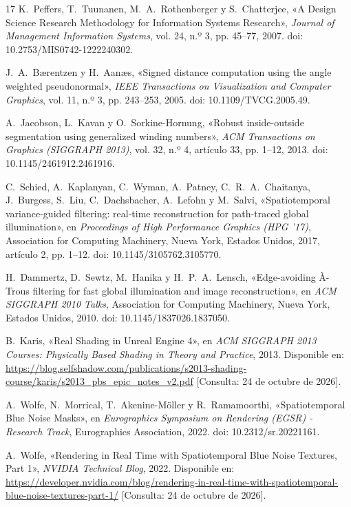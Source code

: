 \begin{thebibliography}{17}
 K.~Peffers, T.~Tuunanen, M.~A.~Rothenberger y S.~Chatterjee, «A Design Science Research Methodology for Information Systems Research», \textit{Journal of Management Information Systems}, vol. 24, n.º 3, pp. 45--77, 2007. doi: 10.2753/MIS0742-1222240302.

 J.~A.~Bærentzen y H.~Aanæs, «Signed distance computation using the angle weighted pseudonormal», \textit{IEEE Transactions on Visualization and Computer Graphics}, vol. 11, n.º 3, pp. 243--253, 2005. doi: 10.1109/TVCG.2005.49.

 A.~Jacobson, L.~Kavan y O.~Sorkine-Hornung, «Robust inside-outside segmentation using generalized winding numbers», \textit{ACM Transactions on Graphics (SIGGRAPH 2013)}, vol. 32, n.º 4, artículo 33, pp. 1--12, 2013. doi: 10.1145/2461912.2461916.

 C.~Schied, A.~Kaplanyan, C.~Wyman, A.~Patney, C.~R.~A.~Chaitanya, J.~Burgess, S.~Liu, C.~Dachsbacher, A.~Lefohn y M.~Salvi, «Spatiotemporal variance-guided filtering: real-time reconstruction for path-traced global illumination», en \textit{Proceedings of High Performance Graphics (HPG ’17)}, Association for Computing Machinery, Nueva York, Estados Unidos, 2017, artículo 2, pp. 1--12. doi: 10.1145/3105762.3105770.

 H.~Dammertz, D.~Sewtz, M.~Hanika y H.~P.~A.~Lensch, «Edge-avoiding À-Trous filtering for fast global illumination and image reconstruction», en \textit{ACM SIGGRAPH 2010 Talks}, Association for Computing Machinery, Nueva York, Estados Unidos, 2010. doi: 10.1145/1837026.1837050.

 B.~Karis, «Real Shading in Unreal Engine 4», en \textit{ACM SIGGRAPH 2013 Courses: Physically Based Shading in Theory and Practice}, 2013. Disponible en: \url{https://blog.selfshadow.com/publications/s2013-shading-course/karis/s2013_pbs_epic_notes_v2.pdf} [Consulta: 24 de octubre de 2026].

 A.~Wolfe, N.~Morrical, T.~Akenine-Möller y R.~Ramamoorthi, «Spatiotemporal Blue Noise Masks», en \textit{Eurographics Symposium on Rendering (EGSR) - Research Track}, Eurographics Association, 2022. doi: 10.2312/sr.20221161.

 A.~Wolfe, «Rendering in Real Time with Spatiotemporal Blue Noise Textures, Part 1», \textit{NVIDIA Technical Blog}, 2022. Disponible en: \url{https://developer.nvidia.com/blog/rendering-in-real-time-with-spatiotemporal-blue-noise-textures-part-1/} [Consulta: 24 de octubre de 2026].


\end{thebibliography}
